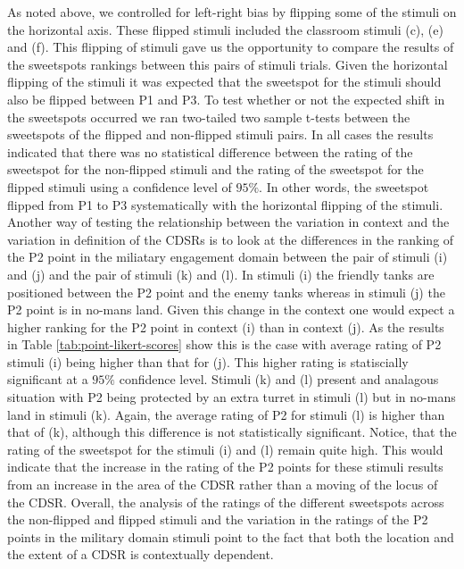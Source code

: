 \documentclass[11pt,letterpaper]{article}
\begin{document}
As noted above, we controlled for left-right bias by flipping some of the stimuli on the horizontal axis. These flipped stimuli included the classroom stimuli (c), (e) and (f). This flipping of stimuli gave us the opportunity to compare the results of the sweetspots rankings between this pairs of stimuli trials. Given the horizontal flipping of the stimuli it was expected that the sweetspot for the stimuli should also be flipped between P1 and P3. To test whether or not the expected shift in the sweetspots occurred we ran two-tailed two sample t-tests between the sweetspots of the flipped and non-flipped stimuli pairs. In all cases the results indicated that there was no statistical difference between the rating of the sweetspot for the non-flipped stimuli and the rating of the sweetspot for the flipped stimuli using a confidence level of $95\%$. In other words, the sweetspot flipped from P1 to P3 systematically with the horizontal flipping of the stimuli. Another way of testing the relationship between the variation in context and the variation in definition of the CDSRs is to look at the differences in the ranking of the P2 point in the miliatary engagement domain between the pair of stimuli (i) and (j) and the pair of stimuli (k) and (l). In stimuli (i) the friendly tanks are positioned between the P2 point and the enemy tanks whereas in stimuli (j) the P2 point is in no-mans land. Given this change in the context one would expect a higher ranking for the P2 point in context (i) than in context (j). As the results in Table \ref{tab:point-likert-scores} show this is the case with average rating of P2  stimuli (i) being higher than that for (j). This higher rating is statiscially significant at a $95\%$ confidence level. Stimuli (k) and (l) present and analagous situation with P2 being protected by an extra turret in stimuli (l) but in no-mans land in stimuli (k). Again, the average rating of P2 for stimuli (l) is higher than that of (k), although this difference is not statistically significant. Notice, that the rating of the sweetspot for the stimuli (i) and (l) remain quite high. This would indicate that the increase in the rating of the P2 points for these stimuli results from an increase in the area of the CDSR rather than a moving of the locus of the CDSR. Overall, the analysis of the ratings of the different sweetspots across the non-flipped and flipped stimuli and the variation in the ratings of the P2 points in the military domain stimuli point to the fact that both the location and the extent of a CDSR is contextually dependent.
\end{document}
